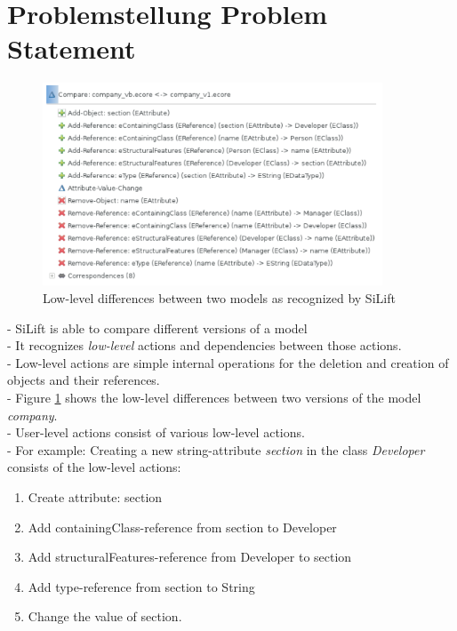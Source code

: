 \documentclass[10pt,a4paper,oneside]{scrartcl}
\begin{document}
	\section{
		{Problemstellung}
		{Problem Statement}}
	\label{sec:problem_statement}
	\begin{figure}
		\centering
		\includegraphics[width=0.9\textwidth]{./res/low-level-actions.png}
		\caption{Low-level differences between two models as recognized by SiLift}
		\label{fig:SiLiftEx}
	\end{figure}
	- SiLift is able to compare different versions of a model
	\\
	- It recognizes \textit{low-level} actions and dependencies between those actions.
	\\
	- Low-level actions are simple internal operations for the deletion and creation of objects and their references.
	\\
	- Figure \ref{fig:SiLiftEx} shows the low-level differences between two versions of the model \textit{company}.
	\\
	- User-level actions consist of various low-level actions.
	\\
	- For example: Creating a new string-attribute \textit{section} in the class \textit{Developer} consists of the low-level actions:
	\\
	\begin{enumerate}
		\item Create attribute: section
		\item Add containingClass-reference from section to Developer
		\item Add structuralFeatures-reference from Developer to section
		\item Add type-reference from section to String
		\item Change the value of section.
	\end{enumerate}
\end{document}
